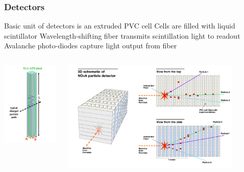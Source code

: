 \documentclass[10pt,professionalfonts,xcolor=table]{beamer}
\begin{document}
\frame
{
\frametitle{\nova Detectors}

\begin{itemize}
\bang Basic unit of \nova detectors is an extruded PVC cell
\bang Cells are filled with liquid scintillator
\bang Wavelength-shifting fiber transmits scintillation light to readout
\bang Avalanche photo-diodes capture light output from fiber
\end{itemize}

\begin{columns}[c]
 \includegraphics[width=1.4\textwidth]{figures/figures/cell.png}
~

\centering
 \includegraphics[width=0.85\textwidth]{figures/figures/schematic.jpg}


\end{columns}}
\end{document}
